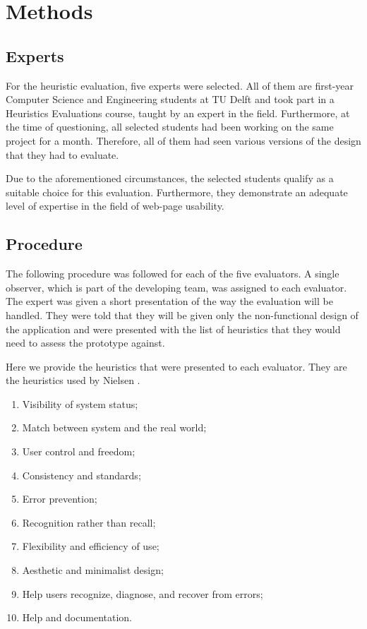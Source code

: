 \section{Methods}
\subsection{Experts}
For the heuristic evaluation, five experts were selected. All of them are first-year Computer Science and Engineering students at TU Delft and took part in a Heuristics Evaluations course, taught by an expert in the field. Furthermore, at the time of questioning, all selected students had been working on the same project for a month. Therefore, all of them had seen various versions of the design that they had to evaluate.

Due to the aforementioned circumstances, the selected students qualify as a suitable choice for this evaluation. Furthermore, they demonstrate an adequate level of expertise in the field of web-page usability.

\subsection{Procedure}
The following procedure was followed for each of the five evaluators. A single observer, which is part of the developing team, was assigned to each evaluator. The expert was given a short presentation of the way the evaluation will be handled. They were told that they will be given only the non-functional design of the application and were presented with the list of heuristics that they would need to assess the prototype against. 

Here we provide the heuristics that were presented to each evaluator. They are the heuristics used by Nielsen \cite{nielsen1994heuristic}.
\begin{enumerate}
  \item Visibility of system status;
  \item Match between system and the real world;
  \item User control and freedom;
  \item Consistency and standards;
  \item Error prevention;
  \item Recognition rather than recall;
  \item Flexibility and efficiency of use;
  \item Aesthetic and minimalist design;
  \item Help users recognize, diagnose, and recover from errors;
  \item Help and documentation.
\end{enumerate}

